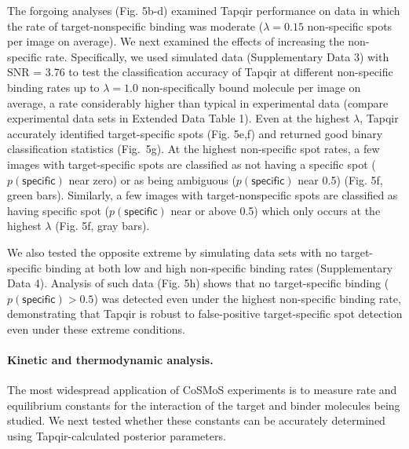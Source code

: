 The forgoing analyses (Fig. 5b-d) examined Tapqir performance on data in which the rate of target-nonspecific binding was moderate ($\lambda  = 0.15$ non-specific spots per image on average).  We next examined the effects of increasing the non-specific rate.  Specifically, we used  simulated data (Supplementary Data 3) with SNR = 3.76 to test the classification accuracy of Tapqir at different non-specific binding rates up to $\lambda  = 1.0$ non-specifically bound molecule per image on average, a rate considerably higher than typical in experimental data (compare experimental data sets in Extended Data Table 1).  Even at the highest $\lambda$,  Tapqir accurately identified target-specific spots (Fig. 5e,f) and returned good binary classification statistics (Fig.~5g).  At the highest non-specific spot rates, a few images with target-specific spots are classified as not having a specific spot ($p(\mathsf{specific})$ near zero) or as being ambiguous ($p(\mathsf{specific})$ near 0.5) (Fig. 5f, green bars). Similarly, a few images with target-nonspecific spots are classified as having specific spot ($p(\mathsf{specific})$ near or above 0.5) which only occurs at the highest $\lambda$ (Fig. 5f, gray bars).

We also tested the opposite extreme by simulating data sets with no target-specific binding at both low and high non-specific binding rates (Supplementary Data 4). Analysis of such data  (Fig. 5h) shows that no target-specific binding ($p(\mathsf{specific}) > 0.5$) was detected even under the highest non-specific binding rate, demonstrating that Tapqir is robust to false-positive target-specific spot detection even under these extreme conditions. 

\paragraph{Kinetic and thermodynamic analysis.}
The most widespread application of CoSMoS experiments is to measure rate and equilibrium constants for the interaction of the target and binder molecules being studied.  We next tested whether these constants can be accurately determined using Tapqir-calculated posterior parameters. 

